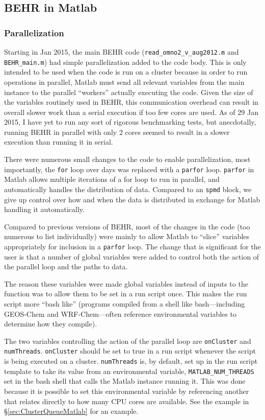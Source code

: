 \documentclass[12pt]{article}
\begin{document}
	\subsection{BEHR in Matlab}
	\subsubsection{Parallelization}
		Starting in Jan 2015, the main BEHR code (\texttt{read\_omno2\_v\_aug2012.m} and \texttt{BEHR\_main.m}) had simple parallelization added to the code body.  This is only intended to be used when the code is run on a cluster because in order to run operations in parallel, Matlab must send all relevant variables from the main instance to the parallel ``workers'' actually executing the code.  Given the size of the variables routinely used in BEHR, this communication overhead can result in overall slower work than a serial execution if too few cores are used.  As of 29 Jan 2015, I have yet to run any sort of rigorous benchmarking tests, but anecdotally, running BEHR in parallel with only 2 cores seemed to result in a slower execution than running it in serial.
		
		There were numerous small changes to the code to enable parallelization, most importantly, the \texttt{for} loop over days was replaced with a \texttt{parfor} loop. \texttt{parfor} in Matlab allows multiple iterations of a for loop to run in parallel, and automatically handles the distribution of data.  Compared to an \texttt{spmd} block, we give up control over how and when the data is distributed in exchange for Matlab handling it automatically.
		
		Compared to previous versions of BEHR, most of the changes in the code (too numerous to list individually) were mainly to allow Matlab to ``slice'' variables appropriately for inclusion in a \texttt{parfor} loop.  The change that is significant for the user is that a number of global variables were added to control both the action of the parallel loop and the paths to data.  

		The reason these variables were made global variables instead of inputs to the function was to allow them to be set in a run script once. This makes the run script more ``bash like'' (programs compiled from a shell like bash---including GEOS-Chem and WRF-Chem---often reference environmental variables to determine how they compile).  
		
		The two variables controlling the action of the parallel loop are \texttt{onCluster} and \texttt{numThreads}. \texttt{onCluster} should be set to true in a run script whenever the script is being executed on a cluster.  \texttt{numThreads} is, by default, set up in the run script template to take its value from an environmental variable, \texttt{MATLAB\_NUM\_THREADS} set in the bash shell that calls the Matlab instance running it.  This was done because it is possible to set this environmental variable by referencing another that relates directly to how many CPU cores are available.  See the example in \S\ref{sec:ClusterQueueMatlab} for an example.
		
\end{document}
